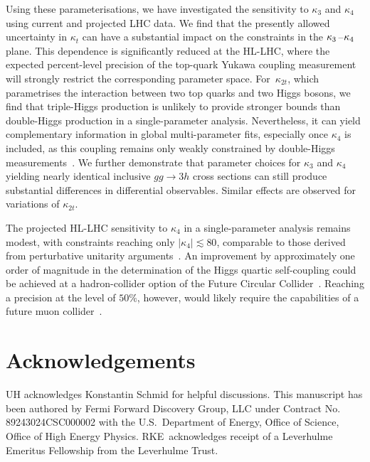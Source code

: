 \documentclass{SciPost}
\begin{document}
Using these parameterisations, we have investigated the sensitivity to $\kappa_3$ and $\kappa_4$ using current and projected LHC data. We find that the presently allowed uncertainty in $\kappa_t$ can have a substantial impact on the constraints in the $\kappa_3\hspace{0.25mm}$--$\hspace{0.25mm}\kappa_4$ plane. This dependence is significantly reduced at the HL-LHC, where the expected percent-level precision of the top-quark Yukawa coupling measurement will strongly restrict the corresponding parameter space. For~$\kappa_{2t}$, which parametrises the interaction between two top quarks and two Higgs bosons, we find that triple-Higgs production is unlikely to provide stronger bounds than double-Higgs production in a single-parameter analysis. Nevertheless, it can yield complementary information in global multi-parameter fits, especially once $\kappa_4$ is included, as this coupling remains only weakly constrained by double-Higgs measurements~\cite{Bizon:2018syu,Borowka:2018pxx,Li:2024iio,Ding:2026qto}. We further demonstrate that parameter choices for $\kappa_3$ and $\kappa_4$ yielding nearly identical inclusive $gg \to 3h$ cross sections can still produce substantial differences in differential observables. Similar effects are observed for variations of $\kappa_{2t}$.

The projected HL-LHC sensitivity to $\kappa_4$ in a single-parameter analysis remains modest, with constraints reaching only $|\kappa_4|\lesssim 80$, comparable to those derived from perturbative unitarity arguments~\cite{Liu:2018peg,Stylianou:2023xit,DiLuzio:2017tfn}. An improvement by approximately one order of magnitude in the determination of the Higgs quartic self-coupling could be achieved at a hadron-collider option of the Future Circular Collider~\cite{Papaefstathiou:2015paa,Chen:2015gva,Fuks:2015hna,Kilian:2017nio,Fuks:2017zkg,Bizon:2018syu,Papaefstathiou:2023uum,Abouabid:2024gms,Dong:2025lkm,Haisch:2025pql,Fuks:2025gjv}. Reaching a precision at the level of $50\%$, however, would likely require the capabilities of a future muon collider~\cite{Chiesa:2020awd}.

\section*{Acknowledgements}
UH acknowledges Konstantin Schmid for helpful discussions. This manuscript has been authored by Fermi Forward Discovery Group, LLC under Contract No. 89243024CSC000002 with the U.S.\ Department of Energy, Office of Science, Office of High Energy Physics. RKE~acknowledges receipt of a Leverhulme Emeritus Fellowship from the Leverhulme Trust.
\end{document}
